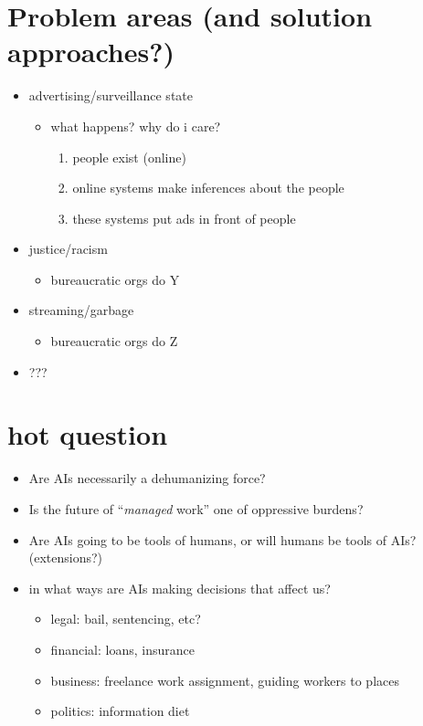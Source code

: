 \documentclass[10pt]{article}
\begin{document}
\section{Problem areas (and solution approaches?)}
\begin{itemize}
  \item advertising/surveillance state
  \begin{itemize}
    \item what happens? {why do i care?}
    \begin{enumerate}
      \item people exist (online)
      \item online systems make inferences about the people
      \item these systems put ads in front of people
    \end{enumerate}
  \end{itemize}
  \item justice/racism
  \begin{itemize}
    \item bureaucratic orgs do Y
  \end{itemize}
  \item streaming/garbage
  \begin{itemize}
    \item bureaucratic orgs do Z
  \end{itemize}
  \item ???
\end{itemize}

\newpage


  \section{hot question}
    \begin{itemize}
      \item Are AIs necessarily a dehumanizing force?
      \item Is the future of ``\textit{managed} work'' one of oppressive burdens?
      \item Are AIs going to be tools of humans, or will humans be tools of AIs? (extensions?)
      
      \item in what ways are AIs making decisions that affect us?
      \begin{itemize}
        \item legal: bail, sentencing, etc?
        \item financial: loans, insurance
        \item business: freelance work assignment, guiding workers to places
        \item politics: information diet
      \end{itemize}

    \end{itemize}
  
\end{document}
